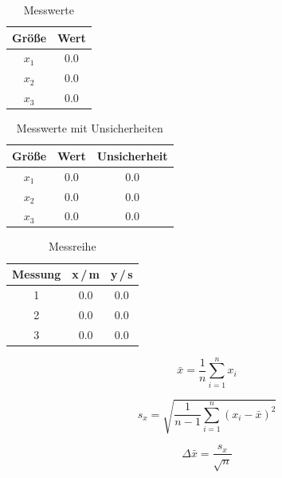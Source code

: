 \documentclass[a4paper, 12pt]{article}
\begin{document}
\begin{table}[h]
    \centering
    
    \label{tab:messwerte}
    \begin{tabular}{cc}
        \toprule
        Größe & Wert \\
        \midrule 
        $x_1$ & 0.0 \\
        $x_2$ & 0.0 \\
        $x_3$ & 0.0 \\
        \bottomrule
    \end{tabular}
    \caption{Messwerte}
\end{table} 

\begin{table}[h]
    \centering
    \caption{Messwerte mit Unsicherheiten}
    \label{tab:messwerte_u}
    \begin{tabular}{ccc}
        \toprule
        Größe & Wert & Unsicherheit \\
        \midrule
        $x_1$ & 0.0 & 0.0 \\
        $x_2$ & 0.0 & 0.0 \\
        $x_3$ & 0.0 & 0.0 \\
        \bottomrule
    \end{tabular}
\end{table}




\begin{table}[h]
    \centering
    \caption{Messreihe}
    \label{tab:messreihe}
    \begin{tabular}{ccc}
        \toprule
        Messung & x\,/\,\si{\meter} & y\,/\,\si{\second} \\
        \midrule
        1 & 0.0 & 0.0 \\
        2 & 0.0 & 0.0 \\
        3 & 0.0 & 0.0 \\
        \bottomrule
    \end{tabular}
\end{table} 


\begin{equation}
    \bar{x} = \frac{1}{n} \sum_{i=1}^{n} x_{i}
    \label{eq:mean}
\end{equation}

\begin{equation}
    s_{x} = \sqrt{\frac{1}{n-1} \sum_{i=1}^{n} \left(x_{i} - \bar{x}\right)^2}
    \label{eq:std}
\end{equation}

\begin{equation}
    \Delta \bar{x} = \frac{s_{x}}{\sqrt{n}}
    \label{eq:sem}
\end{equation}
\end{document}
